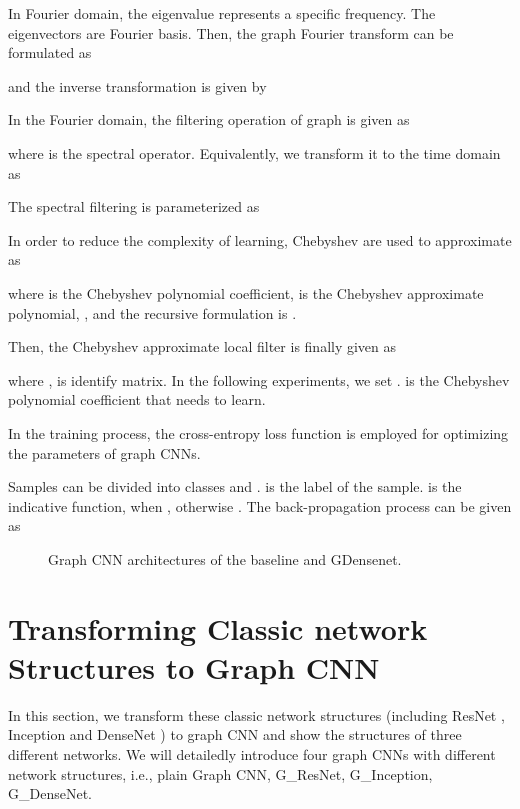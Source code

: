 \documentclass[journal]{IEEEtran}
\begin{document}
In Fourier domain, the eigenvalue represents a specific frequency. The eigenvectors  are Fourier basis. Then, the graph Fourier transform can be formulated as

and the inverse transformation is given by


In the Fourier domain, the filtering operation of graph is given as

where  is the spectral operator.
Equivalently, we transform it to the time domain as


The spectral filtering is parameterized as




In order to reduce the complexity of learning, Chebyshev are used to approximate as

where  is the Chebyshev polynomial coefficient,  is the Chebyshev approximate polynomial, ,  and the recursive formulation is .

Then, the Chebyshev approximate local filter is finally given as

where ,  is identify matrix. In the following experiments, we set .   is the Chebyshev polynomial coefficient that needs to learn.


In the training process, the cross-entropy loss function is employed for optimizing the parameters of graph CNNs.

Samples can be divided into  classes and .  is the label of the sample.  is the indicative function,   when , otherwise .
The back-propagation process can be given as





\begin{figure}[t]
	\centering
	\vspace{-1em}
	\caption{Graph CNN architectures of the baseline and G\underline{\hspace{0.5em}}Densenet.}
	\label{sturcture2}
\end{figure}


\section{Transforming Classic network Structures to Graph CNN}
\label{sec:StruToGraCNN}
In this section, we transform these classic network structures (including ResNet \cite{resnet}, Inception \cite{googleLeNet} and DenseNet \cite{densenet}) to graph CNN and show the structures of  three different networks. We will detailedly introduce four graph CNNs with different network structures, i.e., plain Graph CNN, G\_ResNet, G\_Inception, G\_DenseNet.
\end{document}
